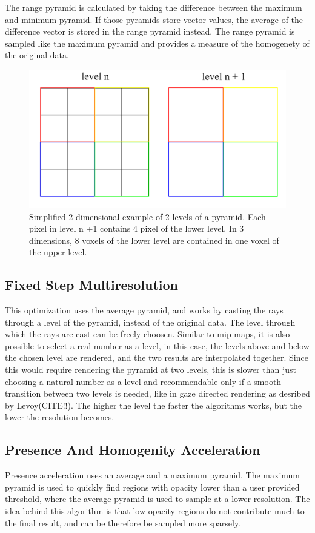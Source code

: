 The range pyramid is calculated by taking the difference between the maximum and minimum pyramid. If those pyramids store vector values, the average of the difference vector is stored in the range pyramid instead.
The range pyramid is sampled like the maximum pyramid and provides a measure of the homogenety of the original data.
 \begin{figure}[htb]
  \centering
  \includegraphics[width=.8\linewidth]{pyramide.png}
  \parbox[t]{.9\columnwidth}{\relax}
  \caption{\label{fig:img3}
         Simplified 2 dimensional example of 2 levels of a pyramid. Each pixel in level n +1 contains 4 pixel of the lower level. In 3 dimensions, 8 voxels of the lower level are contained in one voxel of the upper level.}
\end{figure}


\subsection{Fixed Step Multiresolution}
This optimization uses the average pyramid, and works by casting the rays through a level of the pyramid, instead of the original data. The level through which the rays are cast can be freely choosen. Similar to mip-maps, it is also possible to select a real number as a level, in this case, the levels above and below the chosen level are rendered, and the two results are interpolated together. Since this would require rendering the pyramid at two levels, this is slower than just choosing a natural number as a level and recommendable only if a smooth transition between two levels is needed, like in gaze directed rendering as desribed by Levoy(CITE!!). The higher the level the faster the algorithms works, but the lower the resolution becomes.
\subsection{Presence And Homogenity Acceleration}
Presence acceleration uses an average and a maximum pyramid. The maximum pyramid is used to quickly find regions with opacity lower than a user provided threshold, where the average pyramid is used to sample at a lower resolution. The idea behind this algorithm is that low opacity regions do not contribute much to the final result, and can be therefore be sampled more sparsely.

